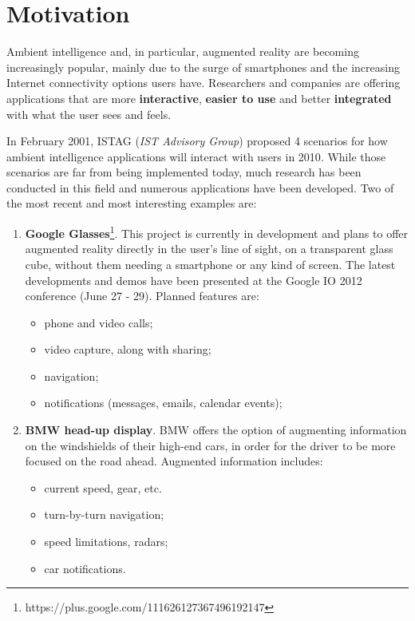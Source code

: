 \documentclass[a4paper,onecolumn,oneside,titlepage,11pt]{report}
\begin{document}
\section{Motivation}
Ambient intelligence and, in particular, augmented reality are becoming increasingly popular, mainly due to the surge of smartphones and the increasing Internet connectivity options users have. Researchers and companies are offering applications that are more \textbf{interactive}, \textbf{easier to use} and better \textbf{integrated} with what the user sees and feels.

In February 2001, ISTAG (\emph{IST Advisory Group}) proposed 4 scenarios for how ambient intelligence applications will interact with users in 2010\cite{ist01}. While those scenarios are far from being implemented today, much research has been conducted in this field and numerous applications have been developed.
Two of the most recent and most interesting examples are:
\begin{enumerate}
	\item \textbf{Google Glasses}\footnote{https://plus.google.com/111626127367496192147}. This project is currently in development and plans to offer augmented reality directly in the user's line of sight, on a transparent glass cube, without them needing a smartphone or any kind of screen. The latest developments and demos have been presented at the Google IO 2012 conference (June 27 - 29). Planned features are:
	\begin{itemize}
		\item phone and video calls;
		\item video capture, along with sharing;
		\item navigation;
		\item notifications (messages, emails, calendar events);
	\end{itemize}
	\item \textbf{BMW head-up display}. BMW offers the option of augmenting information on the windshields of their high-end cars, in order for the driver to be more focused on the road ahead. Augmented information includes:
	\begin{itemize}
		\item current speed, gear, etc.
		\item turn-by-turn navigation;
		\item speed limitations, radars;
		\item car notifications.
	\end{itemize}
\end{enumerate}
\end{document}
